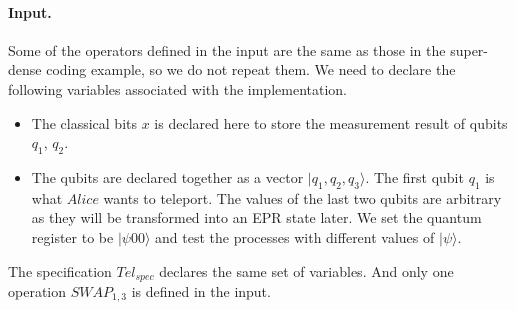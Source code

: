 \documentclass[a4paper,runningheads]{llncs}
\begin{document}
\paragraph{Input.}
Some of the operators defined in the input are the same as those  in the super-dense coding example, so we do not repeat them. We need to declare the following variables associated with the implementation.
\begin{itemize}
    \item The classical bits $x$ is declared here  to store the measurement result of qubits $q_1$, $q_2$.
    \item The qubits are declared together as a vector $|q_1,q_2,q_3\rangle$. The first qubit $q_1$ is what $Alice$ wants to teleport.  The values of the last two qubits are arbitrary as they will be transformed into an EPR state later. We set the quantum register to be $|\psi00\rangle$ and test the processes with different values of $|\psi\rangle$.
\end{itemize}
The specification $Tel_{spec} $ declares the same set of variables. And only one operation $SWAP_{1,3}$ is defined in the input.
\end{document}
